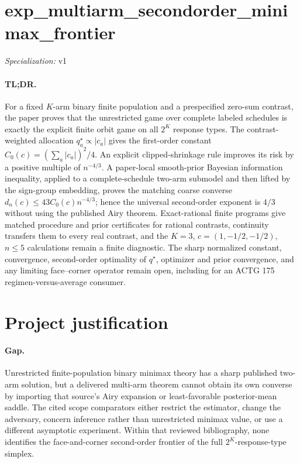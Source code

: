 \documentclass{article}
\begin{document}
\sloppy

\section*{exp\_\allowbreak{}multiarm\_\allowbreak{}secondorder\_\allowbreak{}minimax\_\allowbreak{}frontier}

\noindent\textit{Specialization:} v1\par

\paragraph{TL;DR.} For a fixed \(K\)-arm binary finite population and a prespecified zero-sum contrast, the paper proves that the unrestricted game over complete labeled schedules is exactly the explicit finite orbit game on all \(2^K\) response types. The contrast-weighted allocation \(q_a^\star\propto|c_a|\) gives the first-order constant \(C_0(c)=(\sum_a|c_a|)^2/4\). An explicit clipped-shrinkage rule improves its risk by a positive multiple of \(n^{-4/3}\). A paper-local smooth-prior Bayesian information inequality, applied to a complete-schedule two-arm submodel and then lifted by the sign-group embedding, proves the matching coarse converse \(d_n(c)\leq43C_0(c)n^{-4/3}\); hence the universal second-order exponent is \(4/3\) without using the published Airy theorem. Exact-rational finite programs give matched procedure and prior certificates for rational contrasts, continuity transfers them to every real contrast, and the \(K=3\), \(c=(1,-1/2,-1/2)\), \(n\leq5\) calculations remain a finite diagnostic. The sharp normalized constant, convergence, second-order optimality of \(q^\star\), optimizer and prior convergence, and any limiting face--corner operator remain open, including for an ACTG 175 regimen-versus-average consumer.

\section{Project justification}

\paragraph{Gap.} Unrestricted finite-population binary minimax theory has a sharp published two-arm solution, but a delivered multi-arm theorem cannot obtain its own converse by importing that source's Airy expansion or least-favorable posterior-mean saddle. The cited scope comparators either restrict the estimator, change the adversary, concern inference rather than unrestricted minimax value, or use a different asymptotic experiment. Within that reviewed bibliography, none identifies the face-and-corner second-order frontier of the full \(2^K\)-response-type simplex.
\end{document}
